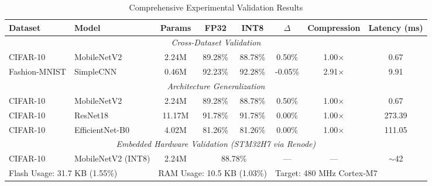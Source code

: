 \begin{table}[t]
\centering
\caption{Comprehensive Experimental Validation Results}
\label{tab:comprehensive_results}
\begin{tabular}{llcccccc}
\hline
\textbf{Dataset} & \textbf{Model} & \textbf{Params} & \textbf{FP32} & \textbf{INT8} & \textbf{$\Delta$} & \textbf{Compression} & \textbf{Latency (ms)} \\
\hline
\multicolumn{8}{c}{\textit{Cross-Dataset Validation}} \\
\hline
CIFAR-10 & MobileNetV2 & 2.24M & 89.28\% & 88.78\% & 0.50\% & 1.00$\times$ & 0.67 \\
Fashion-MNIST & SimpleCNN & 0.46M & 92.23\% & 92.28\% & -0.05\% & 2.91$\times$ & 9.91 \\
\hline
\multicolumn{8}{c}{\textit{Architecture Generalization}} \\
\hline
CIFAR-10 & MobileNetV2 & 2.24M & 89.28\% & 88.78\% & 0.50\% & 1.00$\times$ & 0.67 \\
CIFAR-10 & ResNet18 & 11.17M & 91.78\% & 91.78\% & 0.00\% & 1.00$\times$ & 273.39 \\
CIFAR-10 & EfficientNet-B0 & 4.02M & 81.26\% & 81.26\% & 0.00\% & 1.00$\times$ & 111.05 \\
\hline
\multicolumn{8}{c}{\textit{Embedded Hardware Validation (STM32H7 via Renode)}} \\
\hline
CIFAR-10 & MobileNetV2 (INT8) & 2.24M & \multicolumn{2}{c}{88.78\%} & --- & --- & $\sim$42 \\
\multicolumn{2}{l}{Flash Usage: 31.7 KB (1.55\%)} & \multicolumn{3}{l}{RAM Usage: 10.5 KB (1.03\%)} & \multicolumn{3}{l}{Target: 480 MHz Cortex-M7} \\
\hline
\end{tabular}
\end{table}

